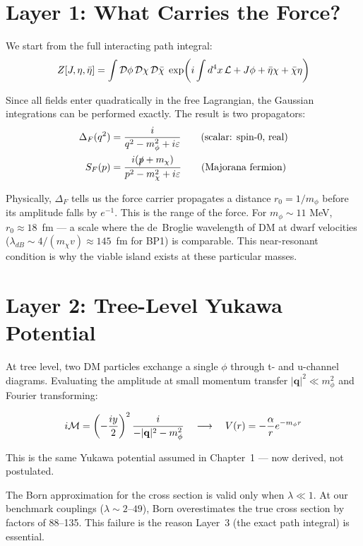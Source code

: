 \section{Layer 1: What Carries the Force?}
\label{ch2:propagators}

We start from the full interacting path integral:
\begin{equation}
  Z[J,\eta,\bar\eta] = \int \mathcal{D}\phi\,\mathcal{D}\chi\,\mathcal{D}\bar\chi\;
  \exp\!\left(i\int d^4x\,\mathcal{L} + J\phi + \bar\eta\chi + \bar\chi\eta\right)
\end{equation}

Since all fields enter quadratically in the free Lagrangian, the Gaussian
integrations can be performed exactly. The result is two propagators:
\begin{align}
  \Delta_F(q^2) &= \frac{i}{q^2 - m_\phi^2 + i\varepsilon}
  \qquad\text{(scalar: spin-0, real)} \\
  S_F(p)        &= \frac{i(\slashed{p} + m_\chi)}{p^2 - m_\chi^2 + i\varepsilon}
  \qquad\text{(Majorana fermion)}
\end{align}

Physically, $\Delta_F$ tells us the force carrier propagates a distance
$r_0 = 1/m_\phi$ before its amplitude falls by $e^{-1}$. This is the range
of the force. For $m_\phi \sim 11$ MeV, $r_0 \approx 18$~fm — a scale where
the de~Broglie wavelength of DM at dwarf velocities
($\lambda_{dB} \sim 4/(m_\chi v)\approx 145$~fm for BP1) is comparable.
This near-resonant condition is why the viable island exists at these particular masses.

\section{Layer 2: Tree-Level Yukawa Potential}
\label{ch2:tree}

At tree level, two DM particles exchange a single $\phi$ through
t- and u-channel diagrams. Evaluating the amplitude at small momentum
transfer $|\mathbf{q}|^2 \ll m_\phi^2$ and Fourier transforming:

\begin{equation}
  i\mathcal{M} = \left(-\frac{iy}{2}\right)^2 \frac{i}{-|\mathbf{q}|^2 - m_\phi^2}
  \quad\longrightarrow\quad
  V(r) = -\frac{\alpha}{r}e^{-m_\phi r}
\end{equation}

This is the same Yukawa potential assumed in Chapter~1 — now derived, not postulated.

The Born approximation for the cross section is valid only when $\lambda \ll 1$.
At our benchmark couplings ($\lambda \sim 2$--$49$), Born overestimates the
true cross section by factors of 88--135. This failure is the reason
Layer~3 (the exact path integral) is essential.

